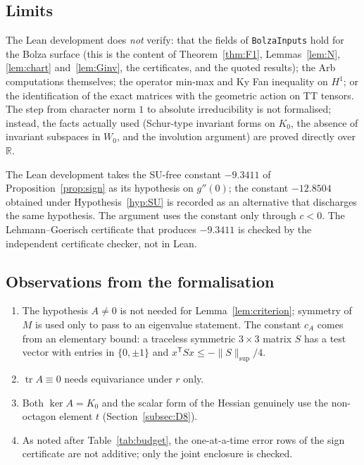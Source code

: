 \documentclass[11pt]{amsart}
\theoremstyle{definition}
\theoremstyle{remark}
\newcommand{\R}{\mathbb{R}}
\newcommand{\tr}{\operatorname{tr}}
\begin{document}
\subsection{Limits}
The Lean development does \emph{not} verify: that the fields of \texttt{BolzaInputs} hold for the
Bolza surface (this is the content of Theorem~\ref{thm:F1}, Lemmas~\ref{lem:N}, \ref{lem:chart}
and~\ref{lem:Ginv}, the certificates, and the quoted results); the Arb computations themselves;
the operator min-max and Ky Fan inequality on $H^1$; or the identification of the exact matrices
with the geometric action on TT tensors. The step from character norm $1$ to absolute
irreducibility is not formalised; instead, the facts actually used (Schur-type invariant forms on
$K_0$, the absence of invariant subspaces in $W_0$, and the involution argument) are proved
directly over $\R$.

The Lean development takes the SU-free constant $-9.3411$ of Proposition~\ref{prop:sign} as its hypothesis on
$g''(0)$; the constant $-12.8504$ obtained under Hypothesis~\ref{hyp:SU} is recorded as an
alternative that discharges the same hypothesis. The argument uses the constant only through $c<0$.
The Lehmann--Goerisch certificate that produces $-9.3411$ is checked by the independent certificate
checker, not in Lean.

\subsection{Observations from the formalisation}
\begin{enumerate}
\item The hypothesis $A\ne0$ is not needed for Lemma~\ref{lem:criterion}; symmetry of $M$ is used only
to pass to an eigenvalue statement. The constant $c_A$ comes from an elementary bound: a traceless
symmetric $3\times3$ matrix $S$ has a test vector with entries in $\{0,\pm1\}$ and $x^{\mathsf T}Sx\le-\|S\|_{\sup}/4$.
\item $\tr A\equiv0$ needs equivariance under $r$ only.
\item Both $\ker A=K_0$ and the scalar form of the Hessian genuinely use the non-octagon element
$t$ (Section~\ref{subsec:D8}).
\item As noted after Table~\ref{tab:budget}, the one-at-a-time error rows of the sign certificate
are not additive; only the joint enclosure is checked.
\end{enumerate}

\end{document}
